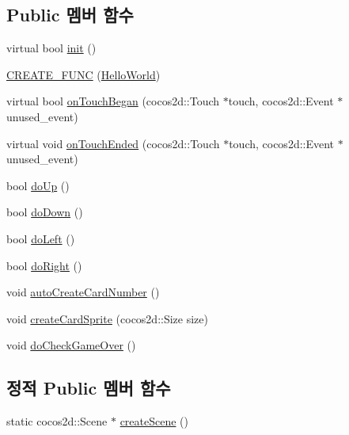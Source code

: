 \subsection*{Public 멤버 함수}
\begin{DoxyCompactItemize}
\item 
virtual bool \hyperlink{classallenlsy_1_1game2048_1_1_hello_world_a129b861a8239d9cf2030b1b59e204a46}{init} ()
\item 
\hyperlink{classallenlsy_1_1game2048_1_1_hello_world_ae76e0150b5abb173d5506283b731a9c7}{C\+R\+E\+A\+T\+E\+\_\+\+F\+U\+NC} (\hyperlink{classallenlsy_1_1game2048_1_1_hello_world}{Hello\+World})
\item 
virtual bool \hyperlink{classallenlsy_1_1game2048_1_1_hello_world_a0cc62fe1173f141d60833be4804f97d9}{on\+Touch\+Began} (cocos2d\+::\+Touch $\ast$touch, cocos2d\+::\+Event $\ast$unused\+\_\+event)
\item 
virtual void \hyperlink{classallenlsy_1_1game2048_1_1_hello_world_a99042e68bb9365cdb764cc9c3d9e6197}{on\+Touch\+Ended} (cocos2d\+::\+Touch $\ast$touch, cocos2d\+::\+Event $\ast$unused\+\_\+event)
\item 
bool \hyperlink{classallenlsy_1_1game2048_1_1_hello_world_aae4ae74d9bc2be114ec52610f3ef3fcc}{do\+Up} ()
\item 
bool \hyperlink{classallenlsy_1_1game2048_1_1_hello_world_ad16dcf9910ecb3abdb12d87765032106}{do\+Down} ()
\item 
bool \hyperlink{classallenlsy_1_1game2048_1_1_hello_world_a1c43b15b314d8d7efaae6f51bef14c56}{do\+Left} ()
\item 
bool \hyperlink{classallenlsy_1_1game2048_1_1_hello_world_a7538c936591be5b39d45ca66ecf83726}{do\+Right} ()
\item 
void \hyperlink{classallenlsy_1_1game2048_1_1_hello_world_af1c795b6d174c1d6d6472e0fe703e648}{auto\+Create\+Card\+Number} ()
\item 
void \hyperlink{classallenlsy_1_1game2048_1_1_hello_world_ad55dd12c9e76eba2e7c79dafbd103e54}{create\+Card\+Sprite} (cocos2d\+::\+Size size)
\item 
void \hyperlink{classallenlsy_1_1game2048_1_1_hello_world_a4f9c99959e2c14cd349470d305909fca}{do\+Check\+Game\+Over} ()
\end{DoxyCompactItemize}
\subsection*{정적 Public 멤버 함수}
\begin{DoxyCompactItemize}
\item 
static cocos2d\+::\+Scene $\ast$ \hyperlink{classallenlsy_1_1game2048_1_1_hello_world_a86ca8a563151e5e5d308f98ff6c36f95}{create\+Scene} ()
\end{DoxyCompactItemize}
